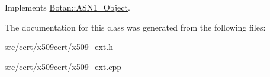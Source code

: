 Implements \hyperlink{classBotan_1_1ASN1__Object_a05db1180efe5c3acc30266d0032823ea}{Botan\-::\-A\-S\-N1\-\_\-\-Object}.



The documentation for this class was generated from the following files\-:\begin{DoxyCompactItemize}
\item 
src/cert/x509cert/x509\-\_\-ext.\-h\item 
src/cert/x509cert/x509\-\_\-ext.\-cpp\end{DoxyCompactItemize}
